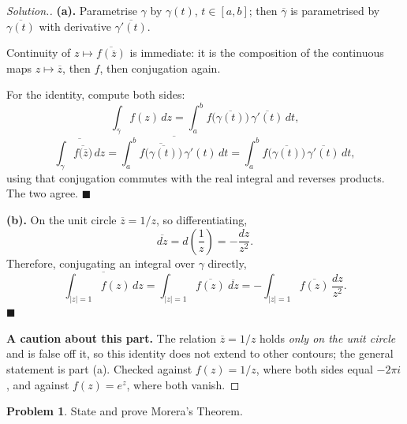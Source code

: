 \documentclass[11pt,a4paper]{article}
\theoremstyle{definition}
\newtheorem{problemx}{Problem}[section]
\newenvironment{problem}{\begin{problemx}}{\end{problemx}}
\newenvironment{solution}
  {\renewcommand{\qedsymbol}{}\begin{proof}[\textit{Solution}.]}
  {\end{proof}}
\begin{document}
\begin{solution}
\textbf{(a).} Parametrise $\gamma$ by $\gamma(t)$, $t \in [a,b]$; then
$\overline{\gamma}$ is parametrised by $\overline{\gamma(t)}$ with derivative
$\overline{\gamma'(t)}$.

Continuity of $z \mapsto \overline{f(\overline{z})}$ is immediate: it is the
composition of the continuous maps $z \mapsto \overline{z}$, then $f$, then
conjugation again.

For the identity, compute both sides:
$$\int_{\overline{\gamma}} f(z)\,dz
= \int^{b}_{a} f\big(\overline{\gamma(t)}\big)\,\overline{\gamma'(t)}\,dt,$$
$$\overline{\int_{\gamma}\overline{f\big(\overline{z}\big)}\,dz}
= \overline{\int^{b}_{a}\overline{f\big(\overline{\gamma(t)}\big)}\,\gamma'(t)\,dt}
= \int^{b}_{a} f\big(\overline{\gamma(t)}\big)\,\overline{\gamma'(t)}\,dt,$$
using that conjugation commutes with the real integral and reverses products.
The two agree. $\blacksquare$

\textbf{(b).} On the unit circle $\overline{z} = 1/z$, so differentiating,
$$\overline{dz} = d\left(\frac{1}{z}\right) = -\frac{dz}{z^{2}} .$$
Therefore, conjugating an integral over $\gamma$ directly,
$$\overline{\int_{\left|z\right|=1} f(z)\,dz}
= \int_{\left|z\right|=1}\overline{f(z)}\ \overline{dz}
= -\int_{\left|z\right|=1}\overline{f(z)}\,\frac{dz}{z^{2}} .$$
$\blacksquare$

\textbf{A caution about this part.} The relation $\overline{z} = 1/z$ holds
\emph{only on the unit circle} and is false off it, so this identity does not
extend to other contours; the general statement is part (a). Checked against
$f(z) = 1/z$, where both sides equal $-2\pi i$, and against $f(z) = e^{z}$, where
both vanish.
\end{solution}


\begin{problem}
State and prove Morera's Theorem.
\end{problem}
\end{document}

